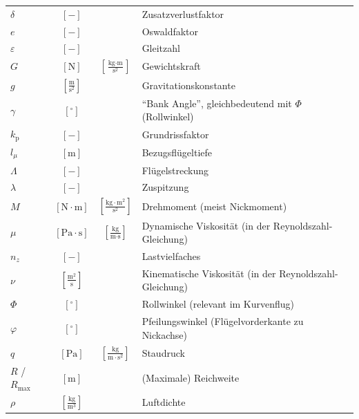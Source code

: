 \begin{raggedright}
\begin{table}[H]
{\begin{tabular}{l c c l}
        $\delta$        & $\left[-\right]$ & & Zusatzverlustfaktor \\[1.4ex]
        $e$             & $\left[-\right]$ & & Oswaldfaktor \\[1.4ex]
        $\varepsilon$   & $\left[-\right]$ & & Gleitzahl \\[1.4ex]
        $G$             & $\left[\text{N}\right]$ & $\left[\frac{\text{kg}\cdot\text{m}}{\text{s}^2}\right]$ & Gewichtskraft \\[2.0ex]
        $g$             & $\left[\frac{\text{m}}{\text{s}^2}\right]$ & & Gravitationskonstante \\[1.4ex]
        $\gamma$        & $\left[^\circ\right]$ & & \enquote{Bank Angle}, gleichbedeutend mit $\Phi$ (Rollwinkel) \\[1.4ex]
        $k_\text{p}$    & $\left[-\right]$ & & Grundrissfaktor \\[1.4ex]
        $l_\mu$         & $\left[\text{m}\right]$ & & Bezugsflügeltiefe \\[1.4ex]
        $\Lambda$       & $\left[-\right]$ & & Flügelstreckung \\[1.4ex]
        $\lambda$       & $\left[-\right]$ & & Zuspitzung \\[1.4ex]
        $M$             & $\left[\text{N}\cdot\text{m}\right]$ & $\left[\frac{\text{kg}\cdot\text{m}^2}{\text{s}^2}\right]$ & Drehmoment (meist Nickmoment) \\[1.4ex]
        $\mu$           & $\left[\text{Pa}\cdot\text{s}\right]$ & $\left[\frac{\text{kg}}{\text{m}\cdot\text{s}}\right]$ & Dynamische Viskosität (in der Reynoldszahl-Gleichung)\\[2.0ex]
        $n_z$           & $\left[-\right]$ & & Lastvielfaches \\[1.4ex]
        $\nu$           & $\left[\frac{\text{m}^2}{\text{s}}\right]$ & & Kinematische Viskosität (in der Reynoldszahl-Gleichung)\\[2.0ex]
        $\Phi$          & $\left[^\circ\right]$ & & Rollwinkel (relevant im Kurvenflug) \\[1.4ex]
        $\varphi$       & $\left[^\circ\right]$ & & Pfeilungswinkel (Flügelvorderkante zu Nickachse) \\[1.4ex]
        $q$             & $\left[\text{Pa}\right]$ & $\left[\frac{\text{kg}}{\text{m}\cdot\text{s}^2}\right]$ & Staudruck \\[2.0ex]
        $R$ / $R_\text{max}$ & $\left[\text{m}\right]$ & & (Maximale) Reichweite \\[1.4ex]
        $\rho$          & $\left[\frac{\text{kg}}{\text{m}^3}\right]$ & & Luftdichte \\[1.4ex]

\end{tabular}}
\end{table}
\end{raggedright}
